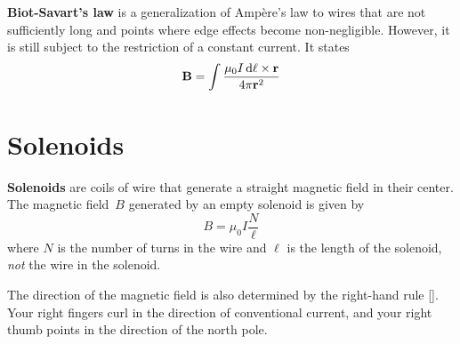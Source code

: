 \textbf{Biot-Savart's law} is a generalization of Ampère's law
to wires that are not sufficiently long
and points where edge effects become non-negligible.
However, it is still subject to the restriction of a constant current.
It states
\begin{equation}
    \vec{B} = \int \frac{\mu_0 I \odif{\ell} \times \vec{r}}{4 \pi \vec{r}^2}
\end{equation}

\section{Solenoids}

\textbf{Solenoids} are coils of wire that generate a straight magnetic field
in their center.
The magnetic field~\(B\) generated by an empty solenoid is given by
\begin{equation}
    B = \mu_0 I \frac{N}{\ell}
\end{equation}
where \(N\) is the number of turns in the wire
and \(\ell\) is the length of the solenoid,
\emph{not} the wire in the solenoid.

The direction of the magnetic field is also determined
by the right-hand rule [].
Your right fingers curl in the direction of conventional current,
and your right thumb points in the direction of the north pole.
